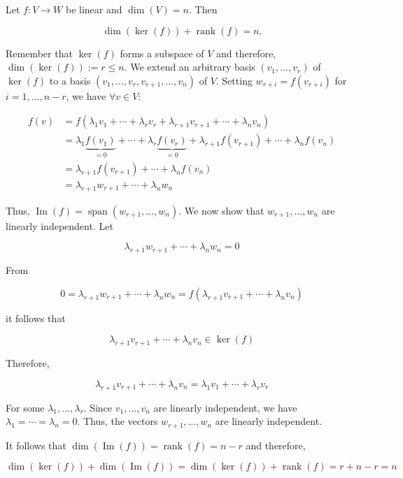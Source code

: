Let \(f: V \to W\) be linear and \(\dim(V) = n\). Then
    
\[
    \dim(\ker(f)) + \operatorname{rank}(f) = n.
\]
    
Remember that \(\ker(f)\) forms a subspace of \(V\) and therefore, \(\dim(\ker(f)) := r \leq n\). We extend an arbitrary basis \((v_1, \ldots, v_r)\) of \(\ker(f)\) to a basis \((v_1, \ldots, v_r, v_{r+1}, \ldots, v_n)\) of \(V\). Setting \(w_{r+i} = f(v_{r+i})\) for \(i = 1, \ldots, n - r\), we have \(\forall v \in V\):

\begin{align*}
    f(v) &= f(\lambda_1v_1 + \cdots + \lambda_r v_r + \lambda_{r+1}v_{r+1} + \cdots + \lambda_n v_n) \\
    &= \lambda_1 \underbrace{f(v_1)}_{=0} + \cdots + \lambda_r \underbrace{f(v_r)}_{=0} + \lambda_{r+1} f(v_{r+1}) + \cdots + \lambda_n f(v_n) \\
    &= \lambda_{r+1} f(v_{r+1}) + \cdots + \lambda_n f(v_n) \\
    &= \lambda_{r+1}w_{r+1} + \cdots + \lambda_n w_n
\end{align*}
    
Thus, \(\operatorname{Im}(f) = \operatorname{span}(w_{r+1}, \ldots, w_n)\). We now show that \(w_{r+1}, \ldots, w_n\) are linearly independent. Let 
    
\[
    \lambda_{r+1}w_{r+1} + \cdots + \lambda_n w_n = 0
\]
    
From

\[
    0 = \lambda_{r+1}w_{r+1} + \cdots + \lambda_n w_n = f(\lambda_{r+1}v_{r+1} + \cdots + \lambda_n v_n)
\]
    
it follows that

\[
    \lambda_{r+1}v_{r+1} + \cdots + \lambda_n v_n \in \ker(f)
\]
    
Therefore,
    
\[
    \lambda_{r+1}v_{r+1} + \cdots + \lambda_n v_n = \lambda_1v_1 + \cdots + \lambda_r v_r
\]

For some \(\lambda_1, \ldots, \lambda_r\). Since \(v_1, \ldots, v_n\) are linearly independent, 
we have \(\lambda_1 = \cdots = \lambda_n = 0\). Thus, the vectors \(w_{r+1}, \ldots, w_n\) are linearly 
independent.
    
It follows that \(\dim(\operatorname{Im}(f)) = \operatorname{rank}(f) = n - r\) and therefore,
    
\[
    \dim(\ker(f)) + \dim(\operatorname{Im}(f)) = \dim(\ker(f)) + \operatorname{rank}(f) = r + n - r = n
\]

